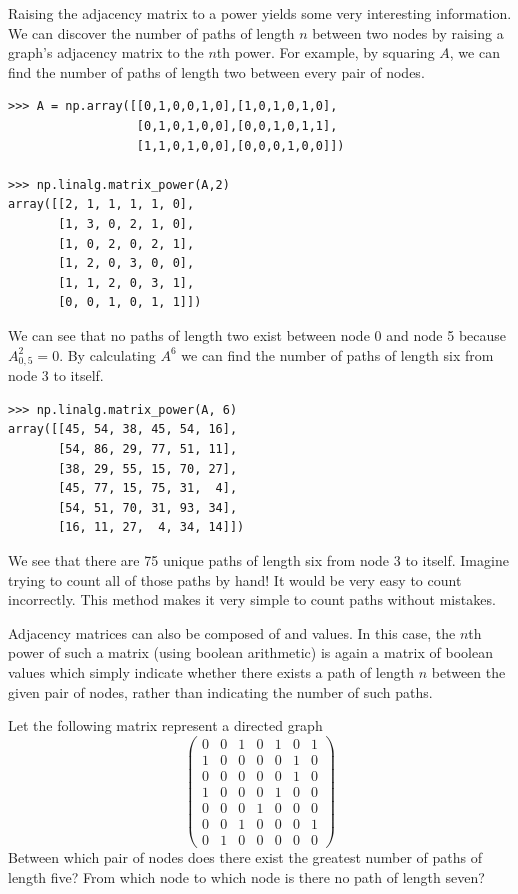 Raising the adjacency matrix to a power yields some very interesting information.
We can discover the number of paths of length $n$ between two nodes by raising a graph's adjacency matrix to the $n$th power.
For example, by squaring $A$, we can find the number of paths of length two between every pair of nodes.
\begin{lstlisting}
>>> A = np.array([[0,1,0,0,1,0],[1,0,1,0,1,0],
                  [0,1,0,1,0,0],[0,0,1,0,1,1],
                  [1,1,0,1,0,0],[0,0,0,1,0,0]])

>>> np.linalg.matrix_power(A,2)
array([[2, 1, 1, 1, 1, 0],
       [1, 3, 0, 2, 1, 0],
       [1, 0, 2, 0, 2, 1],
       [1, 2, 0, 3, 0, 0],
       [1, 1, 2, 0, 3, 1],
       [0, 0, 1, 0, 1, 1]])
\end{lstlisting}
We can see that no paths of length two exist between node 0 and node 5 because $A^2_{0,5} = 0$.
By calculating $A^6$ we can find the number of paths of length six from node 3 to itself.
\begin{lstlisting}
>>> np.linalg.matrix_power(A, 6)
array([[45, 54, 38, 45, 54, 16],
       [54, 86, 29, 77, 51, 11],
       [38, 29, 55, 15, 70, 27],
       [45, 77, 15, 75, 31,  4],
       [54, 51, 70, 31, 93, 34],
       [16, 11, 27,  4, 34, 14]])
\end{lstlisting}
We see that there are 75 unique paths of length six from node 3 to itself.
Imagine trying to count all of those paths by hand!
It would be very easy to count incorrectly.
This method makes it very simple to count paths without mistakes.

Adjacency matrices can also be composed of  and  values.
In this case, the $n$th power of such a matrix (using boolean arithmetic)
is again a matrix of
boolean values which simply indicate whether there exists a path of length $n$ between the given pair of nodes, rather than indicating the number of such
paths.

\begin{problem}
Let the following matrix represent a directed graph
\[
\begin{pmatrix}
0 & 0 & 1 & 0 & 1 & 0 & 1 \\
1 & 0 & 0 & 0 & 0 & 1 & 0 \\
0 & 0 & 0 & 0 & 0 & 1 & 0 \\
1 & 0 & 0 & 0 & 1 & 0 & 0 \\
0 & 0 & 0 & 1 & 0 & 0 & 0 \\
0 & 0 & 1 & 0 & 0 & 0 & 1 \\
0 & 1 & 0 & 0 & 0 & 0 & 0
\end{pmatrix}
\]
Between which pair of nodes does there exist the greatest number of paths
of length five?
From which node to which node is there no path of length seven?
\end{problem}

